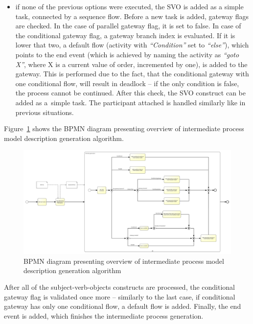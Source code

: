 \begin{itemize}
	\item if none of the previous options were executed, the SVO is added as a simple task, connected by a sequence flow. Before a new task is added, gateway flags are checked. In the case of parallel gateway flag, it is set to false. In case of the conditional gateway flag, a gateway branch index is evaluated. If it is lower that two, a default flow (activity with \emph{``Condition''} set to \emph{``else''}), which points to the end event (which is achieved by naming the activity as \emph{``goto X''}, where X is a current value of order, incremented by one), is added to the gateway. This is performed due to the fact, that the conditional gateway with one conditional flow, will result in deadlock -- if the only condition is false, the process cannot be continued. After this check, the SVO construct can be added as a~simple task. The participant attached is handled similarly like in previous situations.
\end{itemize}
Figure~\ref{fig:intermediate_model_generation} shows the BPMN diagram presenting overview of intermediate process model description generation algorithm.\\
\begin{figure}
	\centering
	\includegraphics[width=0.95\textheight, angle=90]{./images/intermediate_model_generation.pdf}
	\caption{BPMN diagram presenting overview of intermediate process model description generation algorithm}
	\label{fig:intermediate_model_generation}
\end{figure}
After all of the subject-verb-objects constructs are processed, the conditional gateway flag is validated once more -- similarly to the last case, if conditional gateway has only one conditional flow, a default flow is added. Finally, the end event is added, which finishes the intermediate process generation.\\
